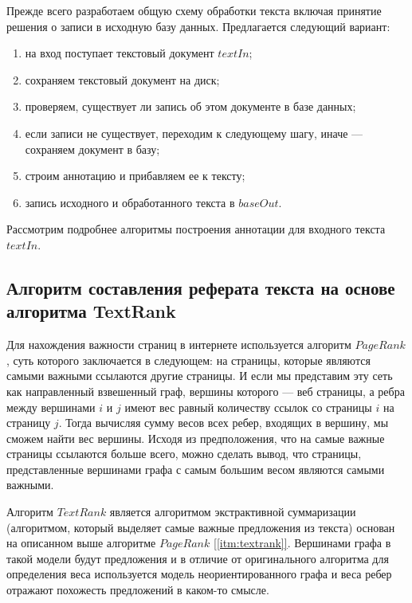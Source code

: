 Прежде всего разработаем общую схему обработки текста включая принятие решения о записи в исходную базу данных. Предлагается следующий вариант:

\begin{enumerate}
    \item на вход поступает текстовый документ $textIn$;
    \item сохраняем текстовый документ на диск;
    \item проверяем, существует ли запись об этом документе в базе данных;
    \item если записи не существует, переходим к следующему шагу, иначе --- сохраняем документ в базу;
    \item строим аннотацию и прибавляем ее к тексту;
    \item запись исходного и обработанного текста в $baseOut$.
\end{enumerate}

Рассмотрим подробнее алгоритмы построения аннотации для входного текста $textIn$. 

\subsection{Алгоритм составления реферата текста на основе алгоритма TextRank}\label{sec:textrank}

Для нахождения важности страниц в интернете используется алгоритм $PageRank$, суть которого заключается в следующем: на страницы, которые являются самыми важными ссылаются другие страницы. И если мы представим эту сеть как направленный взвешенный граф, вершины которого --- веб страницы, а ребра между вершинами $i$ и $j$ имеют вес равный количеству ссылок со страницы $i$ на страницу $j$. Тогда вычисляя сумму весов всех ребер, входящих в вершину, мы сможем найти вес вершины. Исходя из предположения, что на самые важные страницы ссылаются больше всего, можно сделать вывод, что страницы, представленные вершинами графа с самым большим весом являются самыми важными.

Алгоритм $TextRank$ является алгоритмом экстрактивной суммаризации (алгоритмом, который выделяет самые важные предложения из текста) основан на описанном выше алгоритме $PageRank$ \hyperref[itm:textrank]{[\ref{itm:textrank}]}. Вершинами графа в такой модели будут предложения и в отличие от оригинального алгоритма для определения веса используется модель неориентированного графа и веса ребер отражают похожесть предложений в каком-то смысле.

